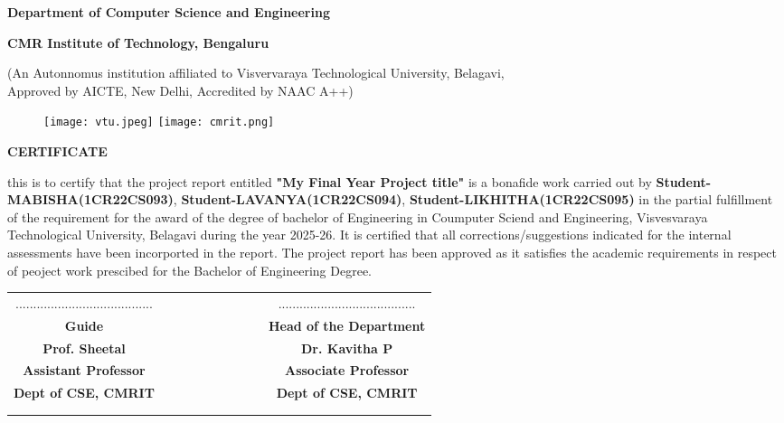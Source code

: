 \documentclass{article}
\newlength{\toptafiddle}
\newlength{\bottafiddle}
\begin{document}
\begin{titlingpage}
\thispagestyle{empty}
\setlength{\toptafiddle}{1in}
\setlength{\bottafiddle}{1in}
\vspace*{-0.75in}
\enlargethispage{\toptafiddle}
\begin{center}
\begin{Large}
\textbf{Department of Computer Science and Engineering} \\
\end{Large}
\begin{Large}
\textbf{CMR Institute of Technology, Bengaluru}\\
\end{Large}
\begin{small}
(An Autonnomus institution affiliated to Visvervaraya Technological University, Belagavi,\\ Approved by AICTE, New Delhi, Accredited by NAAC A++)
\end{small}
\vspace{0.2cm}
\begin{figure}[h]
	\centering
	\texttt{[image: vtu.jpeg]}
	\hspace{0.1\textwidth}
	\texttt{[image: cmrit.png]}
\end{figure}
\Large\textbf{CERTIFICATE}
\end{center}

\begin{normalsize}
this is to certify that the project report entitled \textbf{"My Final Year Project title"} is a bonafide work carried out by \textbf{Student-MABISHA(1CR22CS093)}, \textbf{Student-LAVANYA(1CR22CS094)}, \textbf{Student-LIKHITHA(1CR22CS095)} in the partial fulfillment of the requirement for the award of the degree of bachelor of Engineering in Coumputer Sciend and Engineering, Visvesvaraya Technological University, Belagavi during the year 2025-26. It is certified that all corrections/suggestions indicated for the internal assessments have been incorported in the report. The project report has been approved as it satisfies the academic requirements in respect of peoject work prescibed for the Bachelor of Engineering Degree.
\end{normalsize}
\vfill
\vfill
\vfill
\begin{table}[h!]
\centering
\begin{tabular}{cccccccccc}
.......................................&&&&&&&&&.......................................\\
\textbf{{\footnotesize Guide}} &&&&&&&&&\textbf{{\footnotesize Head of the Department}}\\
\textbf{Prof. Sheetal}&&&&&&&&& \textbf{Dr. Kavitha P} \\
\textbf{{\footnotesize Assistant Professor}} &&&&&&&&& \textbf{{\footnotesize Associate Professor}}\\
\textbf{{\footnotesize Dept of CSE, CMRIT}} &&&&&&&&& \textbf{{\footnotesize Dept of CSE, CMRIT}}\\
\\
\\


\end{tabular}
\end{table}
\end{titlingpage}
\end{document}
